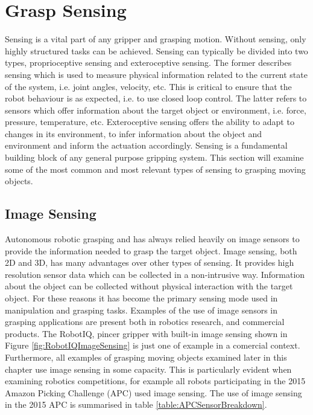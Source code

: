 \section{Grasp Sensing}
Sensing is a vital part of any gripper and grasping motion. Without sensing, only highly structured tasks can be achieved. Sensing can typically be divided into two types, proprioceptive sensing and exteroceptive sensing. The former describes sensing which is used to measure physical information related to the current state of the system, i.e. joint angles, velocity, etc. This is critical to ensure that the robot behaviour is as expected, i.e. to use closed loop control. The latter refers to sensors which offer information about the target object or environment, i.e. force, pressure, temperature, etc. Exteroceptive sensing offers the ability to adapt to changes in its environment, to infer information about the object and environment and inform the actuation accordingly. Sensing is a fundamental building block of any general purpose gripping system. This section will examine some of the most common and most relevant types of sensing to grasping moving objects. 

\subsection{Image Sensing}

Autonomous robotic grasping and has always relied heavily on image sensors to provide the information needed to grasp the target object. Image sensing, both 2D and 3D, has many advantages over other types of sensing. It provides high resolution sensor data which can be collected in a non-intrusive way. Information about the object can be collected without physical interaction with the target object. For these reasons it has become the primary sensing mode used in manipulation and grasping tasks. Examples of the use of image sensors in grasping applications are present both in robotics research, and commercial products. The RobotIQ, pincer gripper with built-in image sensing shown in Figure \ref{fig:RobotIQImageSensing} is just one of example in a comercial context. Furthermore, all examples of grasping moving objects examined later in this chapter use image sensing in some capacity. This is particularly evident when examining robotics competitions, for example all robots participating in the 2015 Amazon Picking Challenge (APC)\cite{APCObservations} used image sensing. The use of image sensing in the 2015 APC is summarised in table \ref{table:APCSensorBreakdown}.

